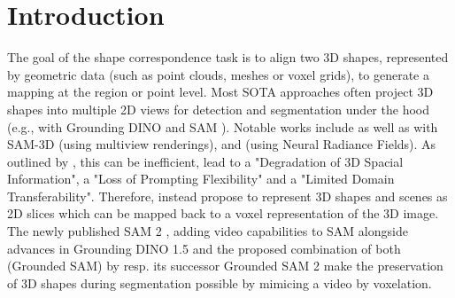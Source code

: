 \section{Introduction}
\label{sec:intro}

The goal of the shape correspondence task is to align two 3D shapes, represented by geometric data (such as point clouds, meshes or voxel grids), to generate a mapping at the region or point level. Most SOTA approaches often project 3D shapes into multiple 2D views for detection and segmentation under the hood (e.g., with Grounding DINO \cite{liu_grounding_2024} and SAM \cite{kirillov_segment_2023}).
Notable works include \citet{liu_partslip_2022} as well as \citet{abdelreheem_zero-shot_2023} with SAM-3D (using multiview renderings), and \citet{cen_segment_2023} (using Neural Radiance Fields). As outlined by \citet{guo_sam2point_2024}, this can be inefficient, lead to a "Degradation of 3D Spacial Information", a "Loss of Prompting Flexibility" and a "Limited Domain Transferability". Therefore, \citet{guo_sam2point_2024} instead propose to represent 3D shapes and scenes as 2D slices which can be mapped back to a voxel representation of the 3D image.
The newly published SAM 2 \cite{ravi_sam_2024}, adding video capabilities to SAM alongside advances in Grounding DINO 1.5 \cite{ren_grounding_2024} and the proposed combination of both (Grounded SAM) by \citet{ren_grounded_2024} resp. its successor Grounded SAM 2 make the preservation of 3D shapes during segmentation possible by mimicing a video by voxelation.